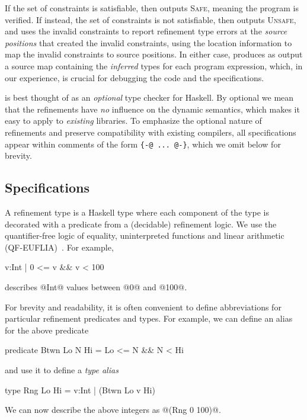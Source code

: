  
If the set of constraints is satisfiable, then \toolname outputs 
\textsc{Safe}, meaning the program is verified.
If instead, the set of constraints is not satisfiable, then \toolname
outputs \textsc{Unsafe}, and uses the invalid constraints to 
report refinement type errors at the \emph{source positions}
that created the invalid constraints, using the location 
information to map the invalid constraints to source positions.
%
In either case, \toolname produces as output a source map
containing the \emph{inferred} types for each program 
expression, which, in our experience, is crucial for 
debugging the code and the specifications.

%
\toolname is best thought of as an \emph{optional} type checker
for Haskell. By optional we mean that the refinements have \emph{no} 
influence on the dynamic semantics, which makes it easy to apply 
\toolname to \emph{existing} libraries.
%
To emphasize the optional nature of refinements and preserve 
compatibility with existing compilers, all specifications 
appear within comments of the form \verb|{-@ ... @-}|, 
which we omit below for brevity.

\subsection{Specifications}

A refinement type is a Haskell type where each component
of the type is decorated with a predicate from a (decidable)
refinement logic. We use the quantifier-free logic of equality, 
uninterpreted functions and linear arithmetic (QF-EUFLIA)~\cite{Nelson81}. 
For example,
%
\begin{code}
   {v:Int | 0 <= v && v < 100}
\end{code}
%
describes @Int@ values between @0@ and @100@.

 For brevity and readability, it is often convenient 
to define abbreviations for particular refinement predicates and types.
For example, we can define an alias for the above predicate
%
\begin{code}
  predicate Btwn Lo N Hi = Lo <= N && N < Hi
\end{code}
%
and use it to define a \emph{type alias}
%
\begin{code}
  type Rng Lo Hi = {v:Int | (Btwn Lo v Hi)} 
\end{code}
%
We can now describe the above integers as @(Rng 0 100)@.

